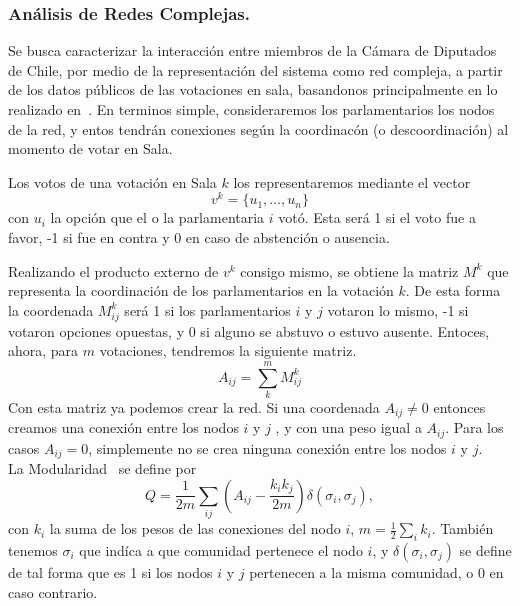 \documentclass{proyectotesis}
\begin{document}
\subsubsection{Análisis de Redes Complejas.}
Se busca caracterizar la interacción entre miembros de la Cámara de Diputados de Chile, por medio de la representación del sistema como red compleja, a partir de los datos públicos de las votaciones en sala, basandonos principalmente en lo realizado en~\cite{Waugh_2009}. En terminos simple, consideraremos los parlamentarios los nodos de la red, y entos tendrán conexiones según la coordinacón (o descoordinación) al momento de votar en Sala.

Los votos de una votación en Sala $k$ los representaremos mediante el vector 
\begin{equation}
    v^k = \{u_1,\dots,u_n\}
\end{equation}
con $u_i$ la opción que el o la parlamentaria $i$ votó. Esta será 1 si el voto fue a favor, -1 si fue en contra y 0 en caso de abstención o ausencia.

Realizando el producto externo de $v^k$ consigo mismo, se obtiene la matriz $M^k$ que representa la coordinación de los parlamentarios en la votación $k$. De esta forma la coordenada $M^k_{ij}$ será 1 si los parlamentarios $i$ y $j$ votaron lo mismo, -1 si votaron opciones opuestas, y 0 si alguno se abstuvo o estuvo ausente. Entoces, ahora, para $m$ votaciones, tendremos la siguiente matriz.
\begin{equation}
    A_{ij} = \sum_k^m M^k_{ij} \label{adj}
\end{equation}
Con esta matriz ya podemos crear la red. Si una coordenada $A_{ij}\neq 0$ entonces creamos una conexión entre los nodos $i$ y $j$ , y con una peso igual a $A_{ij}$. Para los casos $A_{ij} = 0$, simplemente no se crea ninguna conexión entre los nodos $i$ y $j$.\\

La Modularidad~\cite{NewmanGirvan_2004} se define por
\begin{equation}
    Q = \frac{1}{2m}\sum_{ij} \left( A_{ij} - \frac{k_i k_j}{2m}  \right) \delta(\sigma_i,\sigma_j) \label{mod}
,\end{equation}
con $k_i$ la suma de los pesos de las conexiones del nodo $i$, $m = \frac{1}{2} \sum_i k_i$. También tenemos $\sigma_i$ que indíca a que comunidad pertenece el nodo $i$, y $\delta(\sigma_i,\sigma_j)$ se define de tal forma que es 1 si los nodos $i$ y $j$ pertenecen a la misma comunidad, o 0 en caso contrario.\\
\end{document}

